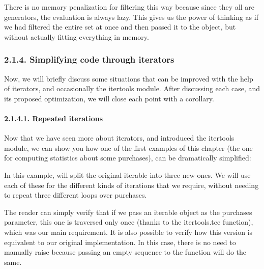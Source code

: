 \documentclass[a4paper,10pt,english]{sphinxmanual}
\begin{document}
There is no memory penalization for filtering this way because since they all are generators,
the evaluation is always lazy. This gives us the power of thinking as if we had filtered the
entire set at once and then passed it to the object, but without actually fitting everything in
memory.


\subsubsection{2.1.4. Simplifying code through iterators}
\label{\detokenize{chapters/7_generators/index:simplifying-code-through-iterators}}
Now, we will briefly discuss some situations that can be improved with the help of
iterators, and occasionally the itertools module. After discussing each case, and its
proposed optimization, we will close each point with a corollary.


\paragraph{2.1.4.1. Repeated iterations}
\label{\detokenize{chapters/7_generators/index:repeated-iterations}}
Now that we have seen more about iterators, and introduced the itertools module, we
can show you how one of the first examples of this chapter (the one for computing statistics
about some purchases), can be dramatically simplified:

\begin{sphinxVerbatim}[commandchars=\\\{\}]
 
         
       
\end{sphinxVerbatim}

In this example,  will split the original iterable into three new ones. We
will use each of these for the different kinds of iterations that we require, without needing
to repeat three different loops over purchases.

The reader can simply verify that if we pass an iterable object as the purchases parameter,
this one is traversed only once (thanks to the itertools.tee function),
which was our main requirement. It is also possible to verify how this version is equivalent
to our original implementation. In this case, there is no need to manually raise 
because passing an empty sequence to the  function will do the same.
\end{document}
